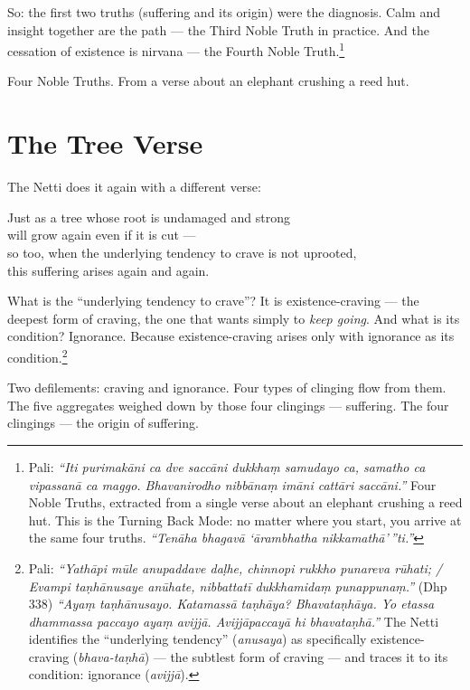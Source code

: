 So: the first two truths (suffering and its origin) were the diagnosis. Calm and insight together are the path --- the Third Noble Truth in practice. And the cessation of existence is nirvana --- the Fourth Noble Truth.\footnote{Pali: \textit{``Iti purimakāni ca dve saccāni dukkhaṃ samudayo ca, samatho ca vipassanā ca maggo. Bhavanirodho nibbānaṃ imāni cattāri saccāni.''} Four Noble Truths, extracted from a single verse about an elephant crushing a reed hut. This is the Turning Back Mode: no matter where you start, you arrive at the same four truths. \textit{``Tenāha bhagavā `ārambhatha nikkamathā'\,''ti.''}}

Four Noble Truths. From a verse about an elephant crushing a reed hut.

\section*{The Tree Verse}

The Netti does it again with a different verse:

\begin{versebox}
Just as a tree whose root is undamaged and strong\\
will grow again even if it is cut ---\\
so too, when the underlying tendency to crave is not uprooted,\\
this suffering arises again and again.
\end{versebox}

What is the ``underlying tendency to crave''? It is existence-craving --- the deepest form of craving, the one that wants simply to \textit{keep going}. And what is its condition? Ignorance. Because existence-craving arises only with ignorance as its condition.\footnote{Pali: \textit{``Yathāpi mūle anupaddave daḷhe, chinnopi rukkho punareva rūhati; / Evampi taṇhānusaye anūhate, nibbattatī dukkhamidaṃ punappunaṃ.''} (Dhp 338) \textit{``Ayaṃ taṇhānusayo. Katamassā taṇhāya? Bhavataṇhāya. Yo etassa dhammassa paccayo ayaṃ avijjā. Avijjāpaccayā hi bhavataṇhā.''} The Netti identifies the ``underlying tendency'' (\textit{anusaya}) as specifically existence-craving (\textit{bhava-taṇhā}) --- the subtlest form of craving --- and traces it to its condition: ignorance (\textit{avijjā}).}

Two defilements: craving and ignorance. Four types of clinging flow from them. The five aggregates weighed down by those four clingings --- suffering. The four clingings --- the origin of suffering.

